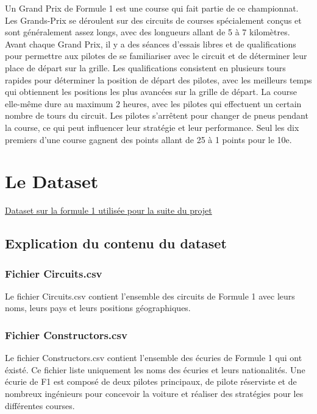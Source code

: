 Un Grand Prix de Formule 1 est une course qui fait partie de ce championnat. Les Grands-Prix se déroulent sur des circuits de courses spécialement conçus et sont généralement assez longs, avec des longueurs allant de 5 à 7 kilomètres. Avant chaque Grand Prix, il y a des séances d'essais libres et de qualifications pour permettre aux pilotes de se familiariser avec le circuit et de déterminer leur place de départ sur la grille. Les qualifications consistent en plusieurs tours rapides pour déterminer la position de départ des pilotes, avec les meilleurs temps qui obtiennent les positions les plus avancées sur la grille de départ. La course elle-même dure au maximum 2 heures, avec les pilotes qui effectuent un certain nombre de tours du circuit. Les pilotes s'arrêtent pour changer de pneus pendant la course, ce qui peut influencer leur stratégie et leur performance. Seul les dix premiers d'une course gagnent des points allant de 25 à 1 points pour le 10e.


\newpage
\section{Le Dataset}

\href{https://www.kaggle.com/datasets/thedevastator/formula-one-racing-a-comprehensive-data-analysis}{Dataset sur la formule 1 utilisée pour la suite du projet}\\

\subsection{Explication du contenu du dataset}

\subsubsection{Fichier Circuits.csv}
Le fichier Circuits.csv contient l'ensemble des circuits de Formule 1 avec leurs noms, leurs pays et leurs positions géographiques.

\subsubsection{Fichier Constructors.csv}
Le fichier Constructors.csv contient l'ensemble des écuries de Formule 1 qui ont éxisté. Ce fichier liste uniquement les noms des écuries et leurs nationalités. Une écurie de F1 est composé de deux pilotes principaux, de pilote réserviste et de nombreux ingénieurs pour concevoir la voiture et réaliser des stratégies pour les différentes courses.

